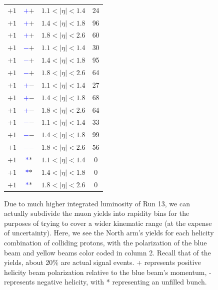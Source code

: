\begin{figure}
\begin{minipage}[c]{0.67\textwidth}
\begin{tabular}{cccc}
      $+1$ &\textbf{\textcolor{blue}{$+$}\textcolor{ucrgold}{$+$}} & $1.1 < \vert\eta\vert < 1.4$ & 24 \\
      $+1$ &\textbf{\textcolor{blue}{$+$}\textcolor{ucrgold}{$+$}} & $1.4 < \vert\eta\vert < 1.8$ & 96 \\
      $+1$ &\textbf{\textcolor{blue}{$+$}\textcolor{ucrgold}{$+$}} & $1.8 < \vert\eta\vert < 2.6$ & 60 \\
      $+1$ &\textbf{\textcolor{blue}{$-$}\textcolor{ucrgold}{$+$}} & $1.1 < \vert\eta\vert < 1.4$ & 30 \\
      $+1$ &\textbf{\textcolor{blue}{$-$}\textcolor{ucrgold}{$+$}} & $1.4 < \vert\eta\vert < 1.8$ & 95 \\
      $+1$ &\textbf{\textcolor{blue}{$-$}\textcolor{ucrgold}{$+$}} & $1.8 < \vert\eta\vert < 2.6$ & 64 \\
      $+1$ &\textbf{\textcolor{blue}{$+$}\textcolor{ucrgold}{$-$}} & $1.1 < \vert\eta\vert < 1.4$ & 27 \\
      $+1$ &\textbf{\textcolor{blue}{$+$}\textcolor{ucrgold}{$-$}} & $1.4 < \vert\eta\vert < 1.8$ & 68 \\
      $+1$ &\textbf{\textcolor{blue}{$+$}\textcolor{ucrgold}{$-$}} & $1.8 < \vert\eta\vert < 2.6$ & 64 \\
      $+1$ &\textbf{\textcolor{blue}{$-$}\textcolor{ucrgold}{$-$}} & $1.1 < \vert\eta\vert < 1.4$ & 33 \\
      $+1$ &\textbf{\textcolor{blue}{$-$}\textcolor{ucrgold}{$-$}} & $1.4 < \vert\eta\vert < 1.8$ & 99 \\
      $+1$ &\textbf{\textcolor{blue}{$-$}\textcolor{ucrgold}{$-$}} & $1.8 < \vert\eta\vert < 2.6$ & 56 \\
      $+1$ &\textbf{\textcolor{blue}{$*$}\textcolor{ucrgold}{$*$}} & $1.1 < \vert\eta\vert < 1.4$ & 0 \\
      $+1$ &\textbf{\textcolor{blue}{$*$}\textcolor{ucrgold}{$*$}} & $1.4 < \vert\eta\vert < 1.8$ & 0 \\
      $+1$ &\textbf{\textcolor{blue}{$*$}\textcolor{ucrgold}{$*$}} & $1.8 < \vert\eta\vert < 2.6$ & 0 \\
      \bottomrule
    \end{tabular}
  \end{minipage}\hfill
  \begin{minipage}[c]{0.3\textwidth}
    \caption{
      Due to much higher integrated luminosity of Run 13, we can actually
      subdivide the muon yields into rapidity bins for the purposes of trying to
      cover a wider kinematic range (at the expense of uncertainty). Here, we see
      the North arm's yields for each helicity combination of colliding protons,
      with the polarization of the blue beam and yellow beams color coded in
      column 2. Recall that of the yields, about 20\% are actual signal events.
      + represents positive helicity beam polarization relative to the blue
      beam's momentum, - represents negative helicity, with * representing an
      unfilled bunch.
    }
    \label{tab:north_sorted_muons_eta_bins}
  \end{minipage}
\end{figure}

